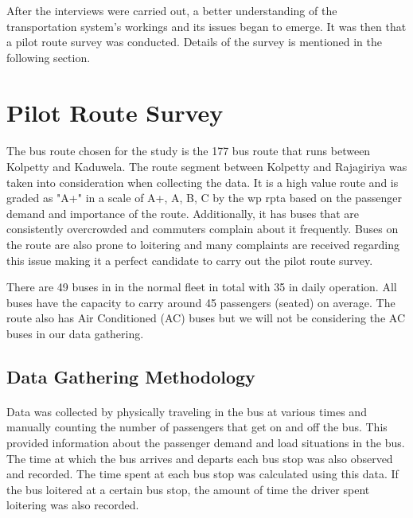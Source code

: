 After the interviews were carried out, a better understanding of the transportation system's workings and its issues began to emerge. It was then that a pilot route survey was conducted. Details of the survey is mentioned in the following section.



\section{Pilot Route Survey}

\paragraph{ } The bus route chosen for the study is the 177 bus route that runs between Kolpetty and Kaduwela. The route segment between Kolpetty and Rajagiriya was taken into consideration when collecting the data. It is a high value route and is graded as "A+" in a scale of A+, A, B, C by the \acrshort{wp} \acrshort{rpta} based on the passenger demand and importance of the route. Additionally, it has buses that are consistently overcrowded and commuters complain about it frequently. Buses on the route are also prone to loitering and many complaints are received regarding this issue making it a perfect candidate to carry out the pilot route survey.

There are 49 buses in in the normal fleet in total with 35 in daily operation. All buses have the capacity to carry around 45 passengers (seated) on average. The route also has Air Conditioned (AC) buses but we will not be considering the AC buses in our data gathering.

\subsection{Data Gathering Methodology}

\paragraph{ } Data was collected by physically traveling in the bus at various times and manually counting the number of passengers that get on and off the bus. This provided information about the passenger demand and load situations in the bus. The time at which the bus arrives and departs each bus stop was also observed and recorded. The time spent at each bus stop was calculated using this data. If the bus loitered at a certain bus stop, the amount of time the driver spent loitering was also recorded.

